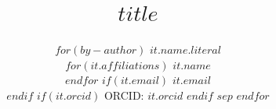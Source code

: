 \usepackage{amsmath,booktabs}
\usepackage{lastpage}

\newcommand{\ISC}{\operatorname{ISC}}
\newcommand{\PER}{\operatorname{PER}}
\newcommand{\CSPD}{\operatorname{CSPD}}
\newcommand{\RCPD}{\operatorname{RCPD}}
\newcommand{\KL}{D_{\mathrm{KL}}}
\newcommand{\Vset}{\mathcal{V}}
\newcommand{\Cset}{\mathcal{C}}
\newcommand{\E}{\mathbb{E}}


\title{$title$}
\author{
$for(by-author)$
\name $it.name.literal$ \\
$for(it.affiliations)$
\addr $it.name$ \\
$endfor$
$if(it.email)$
\email $it.email$ \\
$endif$
$if(it.orcid)$
\addr ORCID: $it.orcid$
$endif$
$sep$
\And
$endfor$
}

